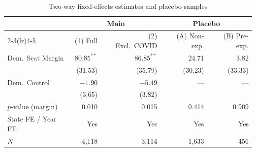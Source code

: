 \documentclass[9pt,twoside]{pnas-new}
\begin{document}
\begin{table}[htbp]
\centering
\caption{Two-way fixed-effects estimates and placebo samples}
\label{tab:panel}
\small
\begin{tabular}{lrrrr}
\toprule
& \multicolumn{2}{c}{Main} & \multicolumn{2}{c}{Placebo}\\
\cmidrule(lr){2-3}\cmidrule(lr){4-5}
& (1) Full & (2) Excl.\ COVID & (A) Non-exp. & (B) Pre-exp.\\
\midrule
Dem.\ Seat Margin & $80.85^{**}$ & $86.85^{**}$ & 24.71 & 3.82\\
 & (31.53) & (35.79) & (30.23) & (33.33)\\
Dem.\ Control & $-1.90$ & $-5.49$ & --- & ---\\
 & (3.65) & (3.82) & & \\
$p$-value (margin) & 0.010 & 0.015 & 0.414 & 0.909\\
State FE / Year FE & Yes & Yes & Yes & Yes\\
$N$ & 4{,}118 & 3{,}114 & 1{,}633 & 456\\
\bottomrule
\end{tabular}
\end{table}
\end{document}
